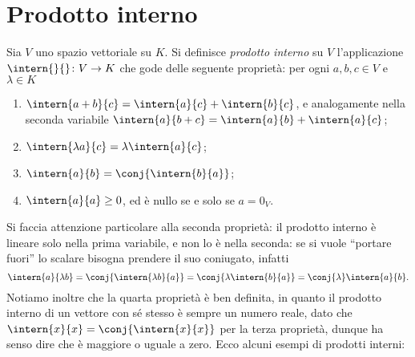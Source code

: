 \section{Prodotto interno}	\label{ref:prodotto-interno}
\begin{definizione} \label{d:prodotto-interno}
	Sia $V$ uno spazio vettoriale su $K$.
	Si definisce \emph{prodotto interno} su $V$ l'applicazione $\intern{}{}\colon V\to K$ che gode delle seguente proprietà: per ogni $  a,  b,  c\in V$ e $\lambda\in K$
	\begin{enumerate}
		\item $\intern{  a+  b}{  c}=\intern{  a}{  c}+\intern{  b}{  c}$, e analogamente nella seconda variabile $\intern{  a}{  b+  c}=\intern{  a}{  b}+\intern{  a}{  c}$;
		\item $\intern{\lambda  a}{  c}=\lambda\intern{  a}{  c}$;
		\item $\intern{  a}{  b}=\conj{\intern{  b}{  a}}$;
		\item $\intern{  a}{  a}\geq 0$, ed è nullo se e solo se $  a=0_V$.
	\end{enumerate}
\end{definizione}
Si faccia attenzione particolare alla seconda proprietà: il prodotto interno è lineare solo nella prima variabile, e non lo è nella seconda: se si vuole ``portare fuori'' lo scalare bisogna prendere il suo coniugato, infatti
\begin{equation*}
	\intern{  a}{\lambda  b}=\conj{\intern{\lambda  b}{  a}}=\conj{\lambda\intern{  b}{  a}}=\conj{\lambda}\intern{  a}{  b}.
\end{equation*}
Notiamo inoltre che la quarta proprietà è ben definita, in quanto il prodotto interno di un vettore con sé stesso è sempre un numero reale, dato che $\intern{  x}{  x}=\conj{\intern{  x}{  x}}$ per la terza proprietà, dunque ha senso dire che è maggiore o uguale a zero.
Ecco alcuni esempi di prodotti interni:
